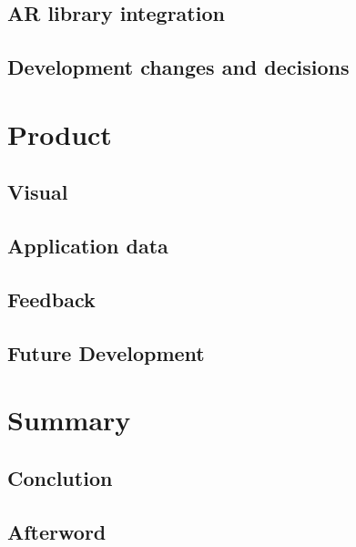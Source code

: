\documentclass[BSP,english,oneside]{classes/gucthesis}
\begin{document}
	\section{AR library integration}
		\label{sec:AR_library_integration}
		

	\section{Development changes and decisions}
		\label{sec:Developmentchangesanddecisions}
		


\chapter{Product}
	\label{chap:product}

	\section{Visual}
		\label{sec:visual}
		

	\section{Application data}
		\label{sec:application_data}
		

	\section{Feedback}
		\label{sec:feedback}
		

	\section{Future Development}
		\label{sec:future_development}
		


\chapter{Summary}
	\label{chap:summary}

	\section{Conclution}
		\label{sec:conclution}
		

	\section{Afterword}
		\label{sec:afterword}
		
\end{document}
